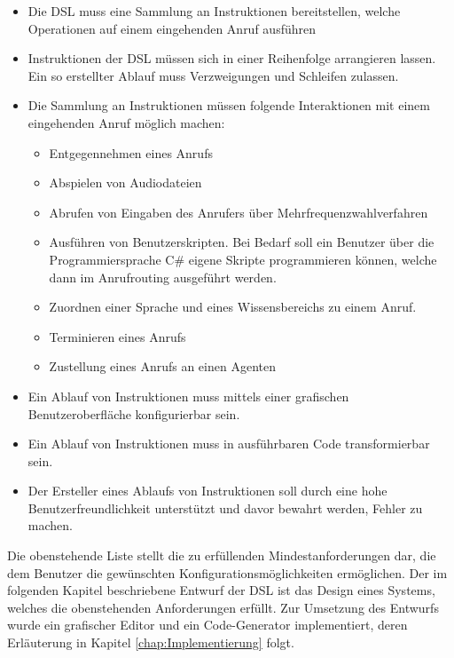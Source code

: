 \begin{itemize}
\item Die DSL muss eine Sammlung an Instruktionen bereitstellen, welche Operationen auf einem eingehenden Anruf ausführen
\item Instruktionen der DSL müssen sich in einer Reihenfolge arrangieren lassen. Ein so erstellter Ablauf muss Verzweigungen und Schleifen zulassen.
\item Die Sammlung an Instruktionen müssen folgende Interaktionen mit einem eingehenden Anruf möglich machen:
	\begin{itemize}
	\item Entgegennehmen eines Anrufs
	\item Abspielen von Audiodateien 
	\item Abrufen von Eingaben des Anrufers über Mehrfrequenzwahlverfahren
	\item Ausführen von Benutzerskripten. Bei Bedarf soll ein Benutzer über die Programmiersprache C\# eigene Skripte programmieren können, welche dann im Anrufrouting ausgeführt werden.
	\item Zuordnen einer Sprache und eines Wissensbereichs zu einem Anruf.
	\item Terminieren eines Anrufs
	\item Zustellung eines Anrufs an einen Agenten
	\end{itemize}
\item Ein Ablauf von Instruktionen muss mittels einer grafischen Benutzeroberfläche konfigurierbar sein.
\item Ein Ablauf von Instruktionen muss in ausführbaren Code transformierbar sein.
\item Der Ersteller eines Ablaufs von Instruktionen soll durch eine hohe Benutzerfreundlichkeit unterstützt und davor bewahrt werden, Fehler zu machen.  
\end{itemize}
Die obenstehende Liste stellt die zu erfüllenden Mindestanforderungen dar, die dem Benutzer die gewünschten Konfigurationsmöglichkeiten ermöglichen. Der im folgenden Kapitel beschriebene Entwurf der DSL ist das Design eines Systems, welches die obenstehenden Anforderungen erfüllt. Zur Umsetzung des Entwurfs wurde ein grafischer Editor und ein Code-Generator implementiert, deren Erläuterung in Kapitel \ref{chap:Implementierung} folgt.

